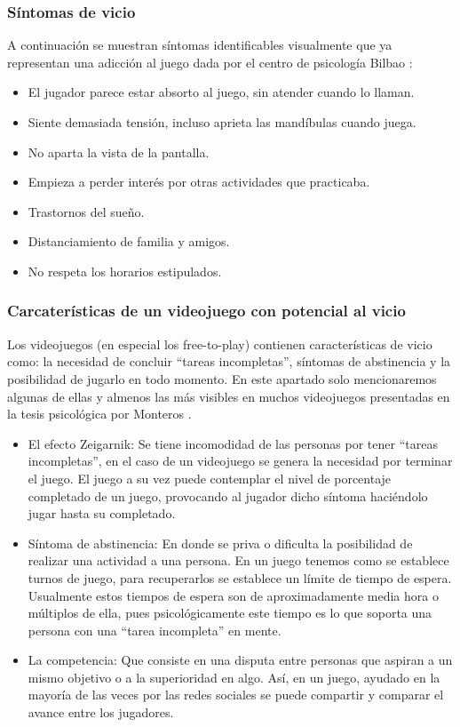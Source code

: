 \subsubsection{Síntomas de vicio}
A continuación se muestran síntomas identificables visualmente que ya representan una adicción al juego dada por el centro de psicología Bilbao \cite{centrodepsicologíabilbaos.l.p.}:
\begin{itemize}
	\item El jugador parece estar absorto al juego, sin atender cuando lo llaman.
	\item Siente demasiada tensión, incluso aprieta las mandíbulas cuando juega.
	\item No aparta la vista de la pantalla.
	\item Empieza a perder interés por otras actividades que practicaba.
	\item Trastornos del sueño.
	\item Distanciamiento de familia y amigos.
	\item No respeta los horarios estipulados.
\end{itemize}


\subsubsection{Carcaterísticas de un videojuego con potencial al vicio}
Los videojuegos (en especial los free-to-play) contienen características de vicio como: la necesidad de concluir “tareas incompletas”, síntomas de abstinencia y la posibilidad de jugarlo en todo momento. En este apartado solo mencionaremos algunas de ellas y almenos las más visibles en muchos videojuegos presentadas en la tesis psicológica por Monteros \cite{montero2014ocios}.

 \begin{itemize}
 	\item El efecto Zeigarnik: Se tiene incomodidad de las personas por tener “tareas incompletas”, en el caso de un videojuego se genera la necesidad por terminar el juego. El juego a su vez puede contemplar el nivel de porcentaje completado de un juego, provocando al jugador dicho síntoma haciéndolo jugar hasta su completado.
 	
 	\item Síntoma de abstinencia: En donde se priva o dificulta la posibilidad de realizar una actividad a una persona. En un juego tenemos como se establece turnos de juego, para recuperarlos se establece un límite de tiempo de espera. Usualmente estos tiempos de espera son de aproximadamente media hora o múltiplos de ella, pues psicológicamente este tiempo es lo que soporta una persona con una “tarea incompleta” en mente.
 	
 	\item La competencia: Que consiste en una disputa entre personas que aspiran a un mismo objetivo o a la superioridad en algo. Así, en un juego, ayudado en la mayoría de las veces por las redes sociales se puede compartir y comparar el avance entre los jugadores.
 	 \\[1pt]
 	
 \end{itemize}

